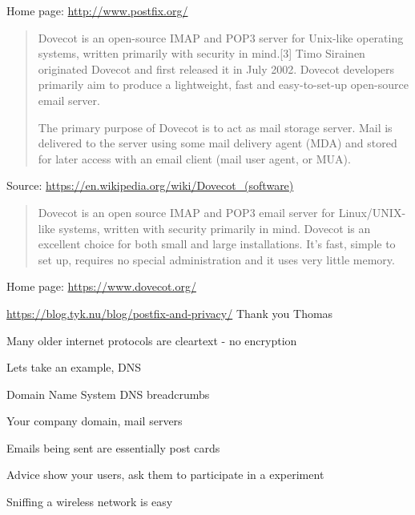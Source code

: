 \documentclass[Screen16to9,17pt]{foils}
\begin{document}
Home page: \url{http://www.postfix.org/}



\begin{quote}\footnotesize
Dovecot is an open-source IMAP and POP3 server for Unix-like operating systems, written primarily with security in mind.[3] Timo Sirainen originated Dovecot and first released it in July 2002. Dovecot developers primarily aim to produce a lightweight, fast and easy-to-set-up open-source email server.

The primary purpose of Dovecot is to act as mail storage server. Mail is delivered to the server using some mail delivery agent (MDA) and stored for later access with an email client (mail user agent, or MUA).
\end{quote}
Source: \url{https://en.wikipedia.org/wiki/Dovecot_(software)}

\begin{quote}\footnotesize
Dovecot is an open source IMAP and POP3 email server for Linux/UNIX-like systems, written with security primarily in mind. Dovecot is an excellent choice for both small and large installations. It's fast, simple to set up, requires no special administration and it uses very little memory.
\end{quote}
Home page: \url{https://www.dovecot.org/}




\url{https://blog.tyk.nu/blog/postfix-and-privacy/} Thank you Thomas




\begin{list1}
\item Many older internet protocols are cleartext - no encryption
\item Lets take an example, DNS
\item Domain Name System DNS breadcrumbs
\begin{list2}
\item Your company domain, mail servers
\item Emails being sent are essentially post cards
\end{list2}
\vskip 1cm
\item Advice show your users, ask them to participate in a experiment
\item Sniffing a wireless network is easy
\end{list1}
\end{document}
